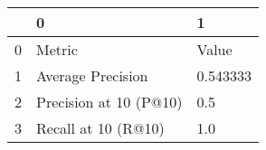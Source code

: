 \begin{tabular}{lll}
\toprule
{} &                       0 &         1 \\
\midrule
0 &                  Metric &     Value \\
1 &       Average Precision &  0.543333 \\
2 &  Precision at 10 (P@10) &       0.5 \\
3 &     Recall at 10 (R@10) &       1.0 \\
\bottomrule
\end{tabular}
